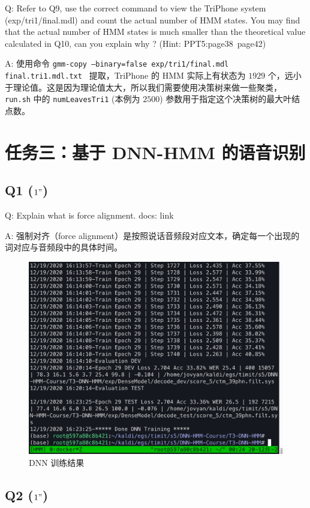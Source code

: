 \documentclass[degree=project,degree-type=project,cjk-font=noto]{thuthesis}
\begin{document}
Q: Refer to Q9, use the correct command to view the TriPhone system (exp/tri1/final.mdl) and count the actual number of HMM states. You may find that the actual number of HMM states is much smaller than the theoretical value calculated in Q10, can you explain why ? (Hint: PPT5:page38~page42)

A: 使用命令 \texttt{gmm-copy --binary=false exp/tri1/final.mdl final.tri1.mdl.txt } 提取，TriPhone 的 HMM 实际上有状态为 $1929$ 个，远小于理论值。这是因为理论值太大，所以我们需要使用决策树来做一些聚类，\texttt{run.sh} 中的 \texttt{numLeavesTri1} (本例为 $2500$) 参数用于指定这个决策树的最大叶结点数。

\chapter{任务三：基于 DNN-HMM 的语音识别}

\section{Q1 ($1"$)}

Q: Explain what is force alignment. docs: link

A: 强制对齐（force alignment）是按照说话音频段对应文本，确定每一个出现的词对应与音频段中的具体时间。

\begin{figure}[h]
\centering%
\includegraphics[width=.8\linewidth]{task3_dnn.png}
  \caption{DNN 训练结果}
  \label{fig:dnn}
\end{figure}

\section{Q2 ($1"$)}
\end{document}

